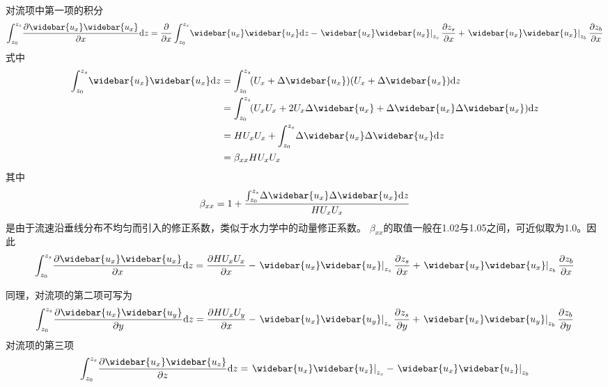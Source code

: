 对流项中第一项的积分
\begin{equation}
    \int_{z_0}^{ z_{s}}\!
    \frac{\partial \widebar{u_{x}}\widebar{u_{x}}}{\partial x}
    \mathrm{d}z
    =
    \frac{\partial}{\partial x}
    \int_{z_0}^{ z_{s}}\!
    \widebar{u_{x}}\widebar{u_{x}}
    \mathrm{d}z
    -
    \left.\widebar{u_{x}}\widebar{u_{x}}\right|_{z_{s}}\frac{\partial  z_{s}}{\partial x}
    +
    \left.\widebar{u_{x}}\widebar{u_{x}}\right|_{z_{b}}\frac{\partial z_{b}}{\partial x}
    \label{EqCGe_CT_1st}
\end{equation}
式中
\begin{equation*}
    \begin{aligned}
    \int_{z_0}^{ z_{s}}\!
    \widebar{u_{x}}\widebar{u_{x}}
    \mathrm{d}z
    &=
    \int_{z_0}^{ z_{s}}\!
    (U_{x}+\Delta\widebar{u_{x}})(U_{x}+\Delta\widebar{u_{x}})
    \mathrm{d}z
    \\
    &=
    \int_{z_0}^{ z_{s}}\!
    (U_{x}U_{x}+2U_{x}\Delta\widebar{u_{x}}+\Delta\widebar{u_{x}}\Delta\widebar{u_{x}})
    \mathrm{d}z
    \\
    &=
    HU_{x}U_{x}
    +
    \int_{z_0}^{ z_{s}}\!
    \Delta\widebar{u_{x}}\Delta\widebar{u_{x}}
    \mathrm{d}z
    \\
    &=
    \beta_{xx}HU_{x}U_{x}
    \end{aligned}
\end{equation*}
其中
\begin{equation}
\beta_{xx}
=
1 +
\frac
{
\int_{z_0}^{ z_{s}}\!
    \Delta\widebar{u_{x}}\Delta\widebar{u_{x}}
\mathrm{d}z
}
{HU_{x}U_{x}}
\end{equation}
是由于流速沿垂线分布不均匀而引入的修正系数，类似于水力学中的动量修正系数。
$\beta_{xx}$的取值一般在1.02与1.05之间，可近似取为1.0。因此
\begin{equation}
    \int_{z_0}^{ z_{s}}\!
    \frac{\partial \widebar{u_{x}}\widebar{u_{x}}}{\partial x}
    \mathrm{d}z
    =
    \frac{\partial HU_{x}U_{x}}{\partial x}
    -
    \left.\widebar{u_{x}}\widebar{u_{x}}\right|_{z_{s}}\frac{\partial  z_{s}}{\partial x}
    +
    \left.\widebar{u_{x}}\widebar{u_{x}}\right|_{z_{b}}\frac{\partial z_{b}}{\partial x}
\end{equation}

同理，对流项的第二项可写为
\begin{equation}
    \int_{z_0}^{ z_{s}}\!
    \frac{\partial \widebar{u_{x}}\widebar{u_{y}}}{\partial y}
    \mathrm{d}z
    =
    \frac{\partial HU_{x}U_{y}}{\partial x}
    -
    \left.\widebar{u_{x}}\widebar{u_{y}}\right|_{z_{s}}\frac{\partial  z_{s}}{\partial y}
    +
    \left.\widebar{u_{x}}\widebar{u_{y}}\right|_{z_{b}}\frac{\partial z_{b}}{\partial y}
\end{equation}
对流项的第三项
\begin{equation}
    \int_{z_0}^{ z_{s}}\!
    \frac{\partial \widebar{u_{x}}\widebar{u_{z}}}{\partial z}
    \mathrm{d}z
    =
    \left.\widebar{u_{x}}\widebar{u_{z}}\right|_{z_{s}}
    -
    \left.\widebar{u_{x}}\widebar{u_{z}}\right|_{z_{b}}
\end{equation}

